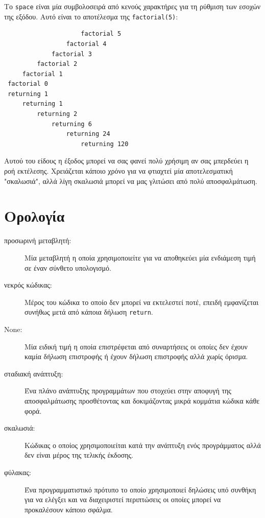 \documentclass[10pt]{book}
\begin{document}
Το {\tt space} είναι μία συμβολοσειρά από κενούς χαρακτήρες για τη
ρύθμιση των εσοχών της εξόδου. Αυτό είναι το αποτέλεσμα της {\tt factorial(5)}:

\begin{verbatim}
                     factorial 5
                 factorial 4
             factorial 3
         factorial 2
     factorial 1
 factorial 0
 returning 1
     returning 1
         returning 2
             returning 6
                 returning 24
                     returning 120
\end{verbatim}
%

Αυτού του είδους η έξοδος μπορεί να σας φανεί πολύ χρήσιμη αν σας μπερδεύει 
η ροή εκτέλεσης. Χρειάζεται κάποιο χρόνο για να φτιαχτεί μία αποτελεσματική
"σκαλωσιά", αλλά λίγη σκαλωσιά μπορεί να μας γλιτώσει από πολύ αποσφαλμάτωση.


\section{Ορολογία}

\begin{description}

\item[προσωρινή μεταβλητή:]  Μία μεταβλητή η οποία χρησιμοποιείτε για να
αποθηκεύει μία ενδιάμεση τιμή σε έναν σύνθετο υπολογισμό.

\item[νεκρός κώδικας:]  Μέρος του κώδικα το οποίο δεν μπορεί να εκτελεστεί ποτέ, επειδή εμφανίζεται συνήθως μετά από κάποια δήλωση {\tt return}.

\item[None:]   Μία ειδική τιμή η οποία επιστρέφεται από συναρτήσεις οι
οποίες δεν έχουν καμία δήλωση επιστροφής ή έχουν δήλωση επιστροφής αλλά χωρίς
όρισμα.

\item[σταδιακή ανάπτυξη:]  Ένα πλάνο ανάπτυξης προγραμμάτων που στοχεύει στην
αποφυγή της αποσφαλμάτωσης προσθέτοντας και δοκιμάζοντας μικρά κομμάτια
κώδικα κάθε φορά.

\item[σκαλωσιά:]  Κώδικας ο οποίος χρησιμοποιείται κατά την ανάπτυξη ενός
προγράμματος αλλά δεν είναι μέρος της τελικής έκδοσης.

\item[φύλακας:]  Ένα προγραμματιστικό πρότυπο το οποίο χρησιμοποιεί δηλώσεις
υπό συνθήκη για να ελέγξει και να διαχειριστεί περιπτώσεις οι οποίες μπορεί
να προκαλέσουν κάποιο σφάλμα.

\end{description}
\end{document}

